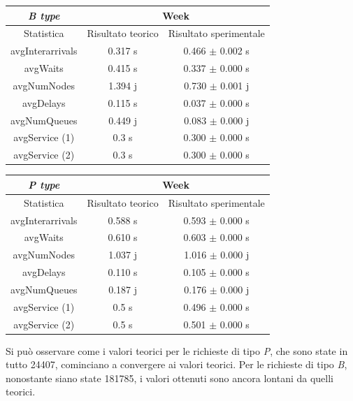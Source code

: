 \documentclass[a4paper, 12pt]{article}
\begin{document}
\begin{table}[H]
\centering
\begin{tabular}{ |c|c|c| }
\hline
\cellcolor{cellcolor} \textit{B type} & \multicolumn{2}{|c|}{\cellcolor{cellcolor}Week} \\
\hline
\cellcolor{cellcolor}Statistica & \cellcolor{cellcolor}Risultato teorico & \cellcolor{cellcolor}Risultato sperimentale \\
\hline
\hline
avgInterarrivals & 0.317 s & 0.466 $\pm$ 0.002 s \\
\hline
avgWaits & 0.415 s & 0.337 $\pm$ 0.000 s \\
\hline
avgNumNodes & 1.394 j & 0.730 $\pm$ 0.001 j \\
\hline
avgDelays & 0.115 s & 0.037 $\pm$ 0.000 s \\
\hline
avgNumQueues & 0.449 j & 0.083 $\pm$ 0.000 j \\
\hline
avgService (1) & 0.3 s & 0.300 $\pm$ 0.000 s \\
\hline
avgService (2) & 0.3 s & 0.300 $\pm$ 0.000 s \\
\hline
\end{tabular}
\end{table}
\bigskip

\begin{table}[H]
\centering
\begin{tabular}{ |c|c|c| }
\hline
\cellcolor{cellcolor} \textit{P type} & \multicolumn{2}{|c|}{\cellcolor{cellcolor}Week} \\
\hline
\cellcolor{cellcolor}Statistica & \cellcolor{cellcolor}Risultato teorico & \cellcolor{cellcolor}Risultato sperimentale \\
\hline
\hline
avgInterarrivals & 0.588 s & 0.593 $\pm$ 0.000 s \\
\hline
avgWaits & 0.610 s & 0.603 $\pm$ 0.000 s \\
\hline
avgNumNodes & 1.037 j & 1.016 $\pm$ 0.000 j \\
\hline
avgDelays & 0.110 s & 0.105 $\pm$ 0.000 s \\
\hline
avgNumQueues & 0.187 j & 0.176 $\pm$ 0.000 j \\
\hline
avgService (1) & 0.5 s & 0.496 $\pm$ 0.000 s \\
\hline
avgService (2) & 0.5 s & 0.501 $\pm$ 0.000 s \\
\hline
\end{tabular}
\end{table}
\bigskip

Si può osservare come i valori teorici per le richieste di tipo \textit{P}, che sono state in tutto 24407, cominciano a convergere ai valori teorici. Per le richieste di tipo \textit{B}, nonostante siano state 181785, i valori ottenuti sono ancora lontani da quelli teorici.\\
\end{document}
